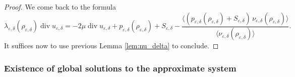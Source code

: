 \documentclass[JEP,XML,SOM,Unicode,NoEqCountersInSection]{cedram}
\newcommand{\<}{\bigl\langle}
\renewcommand{\>}{\bigr\rangle}
\theoremstyle{definition}
\theoremstyle{remark}
\DeclareMathOperator{\Div}{div}
\let\ep\varepsilon
\begin{document}
\begin{proof} We come back to the formula
$$\lambda_{\varepsilon,\delta} (\rho_{\varepsilon,\delta}) \Div u_{\varepsilon,\delta} =
-2 \mu \Div u_{\varepsilon,\delta}
+ p_{\varepsilon,\delta} (\rho_{\varepsilon,\delta}) + S_{\ep,\delta}
- \frac{\<(p_{\varepsilon,\delta} (\rho_{\varepsilon,\delta}) + S_{\ep,\delta})\, \nu_{\varepsilon,\delta} (\rho_{\varepsilon,\delta})\>}{\<\nu_{\varepsilon,\delta} (\rho_{\varepsilon,\delta})\>}.
$$
It suffices now to use previous Lemma \ref{lem:nu_delta} to conclude.
\end{proof}

\subsubsection*{Existence of global solutions to the approximate system}
\end{document}
